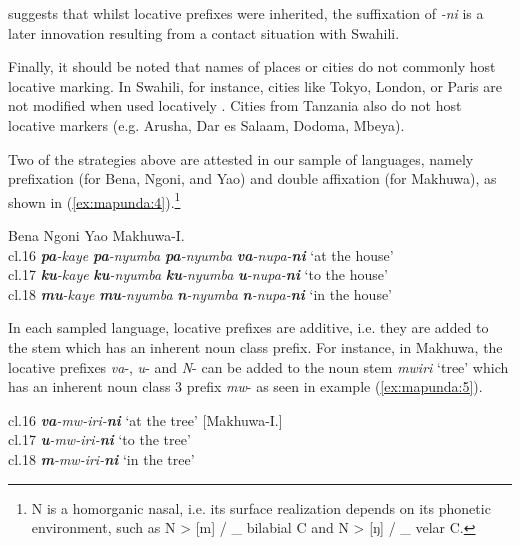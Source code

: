 \documentclass[output=paper ]{langscibook}
\begin{document}
\citet{Guérois2016} suggests that whilst locative prefixes were inherited, the suffixation of \textit{{}-ni} is a later innovation resulting from a contact situation with Swahili. 

Finally, it should be noted that names of places or cities do not commonly host locative marking. In Swahili, for instance, cities like Tokyo, London, or Paris are not modified when used locatively \citep[153]{Mkude2005}. Cities from Tanzania also do not host locative markers (e.g. Arusha, Dar es Salaam, Dodoma, Mbeya).   

Two of the strategies above are attested in our sample of languages, namely prefixation (for Bena, Ngoni, and Yao) and double affixation (for Makhuwa), as shown in (\ref{ex:mapunda:4}).\footnote{{N is a homorganic nasal, i.e. its surface realization depends on its phonetic environment, such as N > [m] / \_ bilabial C and N > [ŋ] / \_ velar C.} }  


\ea 
    \label{ex:mapunda:4}
    \gllll {} Bena    Ngoni    Yao    Makhuwa{}-I.  \\
cl.16  \textbf{\textit{pa}}\textit{{}-kaye}   \textbf{\textit{pa}}\textit{{}-nyumba} \textbf{\textit{pa}}\textit{{}-nyumba} \textbf{\textit{va}}\textit{{}-nupa-}\textbf{\textit{ni}}  {‘at the house’}\\  
cl.17        \textbf{\textit{ku}}\textit{{}-kaye} \textbf{\textit{ku}}\textit{{}-nyumba}   \textbf{\textit{ku}}\textit{{}-nyumba}   \textbf{\textit{u}}\textit{{}-nupa-}\textbf{\textit{ni}}   {‘to the house’}\\  
cl.18  \textbf{\textit{mu}}\textit{{}-kaye}  \textbf{\textit{mu}}\textit{{}-nyumba}   \textbf{\textit{n}}\textit{{}-nyumba}   \textbf{\textit{n}}\textit{{}-nupa-}\textbf{\textit{ni}}   {‘in the house’}\\
\z

In each sampled language, locative prefixes are additive, i.e. they are added to the stem which has an inherent noun class prefix. For instance, in Makhuwa, the locative prefixes \textit{va}{}-, \textit{u}{}- and \textit{N}{}- can be added to the noun stem \textit{mwiri} ‘tree’ which has an inherent noun class 3 prefix \textit{mw}{}- as seen in example (\ref{ex:mapunda:5}).


\ea 
\label{ex:mapunda:5}
\glll cl.16  \textbf{\textit{va}}\textit{{}-mw-iri-}\textbf{\textit{ni}}  {‘at the tree’} \hspace{4cm}[Makhuwa-I.]\\
cl.17        \textbf{\textit{u}}\textit{{}-mw-iri-}\textbf{\textit{ni}}   {‘to the tree’}\\  
cl.18  \textbf{\textit{m}}\textit{{}-mw-iri-}\textbf{\textit{ni}}   {‘in the tree’}\\
\z
\end{document}
